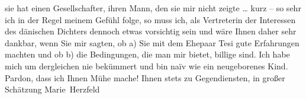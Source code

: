 \begin{ledgroupsized}[t]{13cm}
               sie hat einen Gesellschafter, ihren Mann, den sie mir nicht zeigte {\dots}
               kurz – so sehr ich in der Regel meinem Gefühl folge, so muss ich, als Vertreterin der
               Interessen des dänischen
                  Dichters dennoch etwas vorsichtig sein und wäre Ihnen daher sehr dankbar,
               wenn Sie mir sagten, {\pb}ob \introOben{}a)\introOben{} Sie
               mit dem Ehepaar Tesi gute Erfahrungen
               machten und ob b) die Bedingungen, die man mir bietet, billige sind. Ich habe mich um
               dergleichen nie bekümmert und bin naïv wie ein neugeborenes Kind.\pend
           \pstart
           Pardon, dass ich Ihnen Mühe mache! Ihnen stets zu Gegendiensten, in großer
               Schätzung\pend
           \pstart \spacefill\mbox{Marie Herzfeld}\pend{}
         
         \endnumbering{}\end{ledgroupsized}  \newcommand{\dateiname}{L02593}\newcommand{\titel}{Marie Herzfeld an Arthur Schnitzler, 19. 4. 1909}\newcommand{\editorInnen}{Martin Anton Müller und Laura Untner}
      